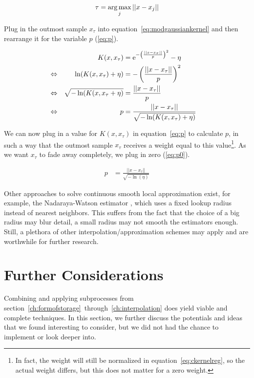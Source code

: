 \begin{align}
\label{eq:tau}
\tau = \operatorname*{arg\,max}_j ||x - x_j||
\end{align}

Plug in the outmost sample $x_\tau$ into equation~\ref{eq:modgaussiankernel} and then rearrange it for the variable $p$ (\ref{eq:p}). 

\begin{align}
&&K(x, x_\tau)&=\mathrm{e}^{-\left(\frac{||x-x_\tau||}{p}\right)^2} - \eta \label{eq:modgaussiankernel} &&\\
\Leftrightarrow&&\ln(K(x, x_\tau) + \eta) &= -\left(\frac{||x-x_\tau||}{p}\right)^2 \notag &&\\
\Leftrightarrow&& \sqrt{-\ln(K(x, x_\tau + \eta)} &= \frac{||x-x_\tau||}{p} \notag &&\\
\Leftrightarrow&& p &= \frac{||x-x_\tau||}{\sqrt{-\ln(K(x, x_\tau) + \eta)}} \label{eq:p}&&
\end{align}

We can now plug in a value for $K(x, x_\tau)$ in equation~\ref{eq:p} to calculate $p$, in such a way that the outmost sample $x_\tau$ receives a weight equal to this value\footnote{In fact, the weight will still be normalized in equation~\ref{eq:ckernelreg}, so the actual weight differs, but this does not matter for a zero weight.}. As we want $x_\tau$ to fade away completely, we plug in zero (\ref{eq:p0}).

\begin{align}
p &= \frac{||x-x_\tau||}{\sqrt{-\ln(\eta)}} \label{eq:p0}
\end{align}

Other approaches to solve continuous smooth local approximation exist, for example, the Nadaraya-Watson estimator \cite{nadaraya1964estimating}, which uses a fixed lookup radius instead of nearest neighbors. This suffers from the fact that the choice of a big radius may blur detail, a small radius may not smooth the estimators enough. Still, a plethora of other interpolation/approximation schemes may apply and are worthwhile for further research.


\section{Further Considerations}

Combining and applying subprocesses from section~\ref{ch:formofstorage}~through~\ref{ch:interpolation} does yield viable and complete techniques. In this section, we further discuss the potentials and ideas that we found interesting to consider, but we did not had the chance to implement or look deeper into.

